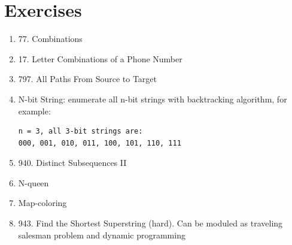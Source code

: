 \documentclass[../main.tex]{subfiles}
\begin{document}
\section{Exercises}
\begin{enumerate}
\item 77. Combinations
\item 17. Letter Combinations of a Phone Number
\item 797. All Paths From Source to Target
    \item N-bit String: enumerate all n-bit strings with backtracking algorithm, for example:
\begin{lstlisting}[numbers=none]
n = 3, all 3-bit strings are:
000, 001, 010, 011, 100, 101, 110, 111
\end{lstlisting}
\item 940. Distinct Subsequences II
\item N-queen
\item Map-coloring
\item 943. Find the Shortest Superstring (hard). Can be moduled as traveling salesman problem and dynamic programming
\end{enumerate}
\end{document}
